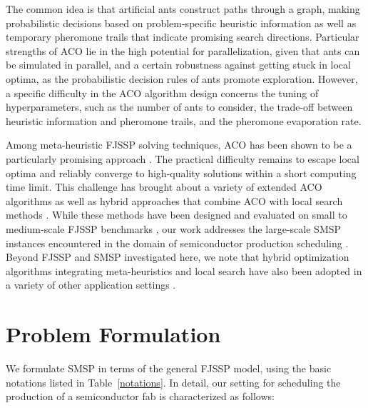 \documentclass[runningheads]{llncs}
\begin{document}
The common idea is that artificial ants construct paths through a graph,
making probabilistic decisions based on problem-specific heuristic information as well as temporary pheromone trails that indicate
promising search directions.
Particular strengths of ACO lie in the high potential for parallelization,
given that ants can be simulated in parallel,
and a certain robustness against getting stuck in local optima,
as the probabilistic decision rules of ants promote exploration.
However, a specific difficulty in the ACO algorithm design concerns the
tuning of hyperparameters, such as the number of ants to consider,
the trade-off between heuristic information and pheromone trails, and
the pheromone evaporation rate. 

Among meta-heuristic FJSSP solving techniques,
ACO has been shown to be a particularly promising approach \cite{turkyilmaz2020research}.
The practical difficulty remains to escape local optima and reliably
converge to high-quality solutions within a short computing time limit.
This challenge has brought about a variety of extended ACO algorithms as well as
hybrid approaches that combine ACO with local search methods
\cite{leung2010integrated,li2010improved,xing2010knowledge,thammano2013hybrid,arnaout2014two,el2017dual}.
While these methods have been designed and evaluated
on small to medium-scale FJSSP benchmarks \cite{arnaout2014two},
our work addresses the large-scale SMSP instances encountered in
the domain of semiconductor production scheduling \cite{kopp2020smt2020}.
Beyond FJSSP and SMSP investigated here,
we note that hybrid optimization algorithms integrating meta-heuristics and
local search have also been adopted in a variety of other application settings
\cite{abdel2021hybrid,fontes2023hybrid,li2021hybrid,mohd2023improved,suid2023novel}.


\section{Problem Formulation}
\label{sec:problem_f}

We formulate SMSP in terms of the general FJSSP model,
using the basic notations listed in Table~\ref{notations}. 
In detail, our setting for scheduling the production of a semiconductor fab is characterized as follows:
\end{document}
